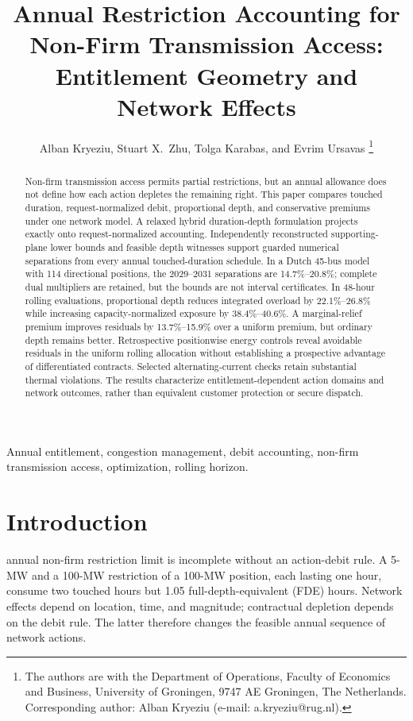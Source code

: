 \documentclass[10pt,journal]{IEEEtran}
\title{Annual Restriction Accounting for Non-Firm Transmission Access: Entitlement Geometry and Network Effects}
\author{Alban Kryeziu, Stuart X.~Zhu, Tolga Karabas, and Evrim Ursavas%
\thanks{The authors are with the Department of Operations, Faculty of Economics and Business, University of Groningen, 9747 AE Groningen, The Netherlands. Corresponding author: Alban Kryeziu (e-mail: a.kryeziu@rug.nl).}}
\begin{document}
\maketitle
\begin{abstract}
Non-firm transmission access permits partial restrictions, but an annual allowance does not define how each action depletes the remaining right. This paper compares touched duration, request-normalized debit, proportional depth, and conservative premiums under one network model. A relaxed hybrid duration-depth formulation projects exactly onto request-normalized accounting. Independently reconstructed supporting-plane lower bounds and feasible depth witnesses support guarded numerical separations from every annual touched-duration schedule. In a Dutch 45-bus model with 114 directional positions, the 2029--2031 separations are 14.7\%--20.8\%; complete dual multipliers are retained, but the bounds are not interval certificates. In 48-hour rolling evaluations, proportional depth reduces integrated overload by 22.1\%--26.8\% while increasing capacity-normalized exposure by 38.4\%--40.6\%. A marginal-relief premium improves residuals by 13.7\%--15.9\% over a uniform premium, but ordinary depth remains better. Retrospective positionwise energy controls reveal avoidable residuals in the uniform rolling allocation without establishing a prospective advantage of differentiated contracts. Selected alternating-current checks retain substantial thermal violations. The results characterize entitlement-dependent action domains and network outcomes, rather than equivalent customer protection or secure dispatch.
\end{abstract}
\begin{IEEEkeywords}
Annual entitlement, congestion management, debit accounting, non-firm transmission access, optimization, rolling horizon.
\end{IEEEkeywords}

\section{Introduction}
\label{sec:intro}
 annual non-firm restriction limit is incomplete without an action-debit rule. A 5-MW and a 100-MW restriction of a 100-MW position, each lasting one hour, consume two touched hours but 1.05 full-depth-equivalent (FDE) hours. Network effects depend on location, time, and magnitude; contractual depletion depends on the debit rule. The latter therefore changes the feasible annual sequence of network actions.
\end{document}
